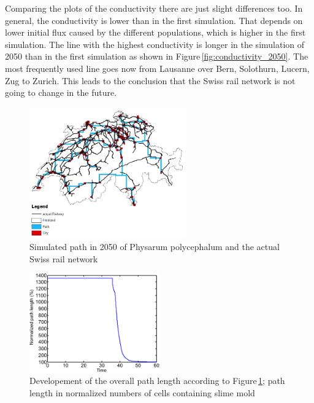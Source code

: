 \documentclass[11pt]{scrartcl}
\begin{document}
Comparing the plots of the conductivity there are just slight differences too. In general, the conductivity is lower than in the first simulation. That depends on lower initial flux caused by the different populations, which is higher in the first simulation. The line with the highest conductivity is longer in the simulation of 2050 than in the first simulation as shown in Figure\,\ref{fig:conductivity_2050}. The most frequently used line goes now from Lausanne over Bern, Solothurn, Lucern, Zug to Zurich. This leads to the conclusion that the Swiss rail network is not going to change in the future.

\begin{figure}[H]
	\centering
	\includegraphics[width=0.6\textwidth]{figures/path_railway_2050}
	\caption{Simulated path in 2050 of Physarum polycephalum and the actual Swiss rail network}
	\label{fig:path_2050}
\end{figure}

\begin{figure}[H]
	\centering
	\includegraphics[width=0.5\textwidth]{figures/plottrail2}
	\caption{Development of the overall path length according to Figure\,\ref{fig:path_2050}; path length in normalized numbers (to the value of convergence) of cells containing slime mold}
	\caption{Developement of the overall path length according to Figure\,\ref{fig:path_2050}; path length in normalized numbers of cells containing slime mold}
	\label{fig:plottrail_2050}
\end{figure}
\end{document}

